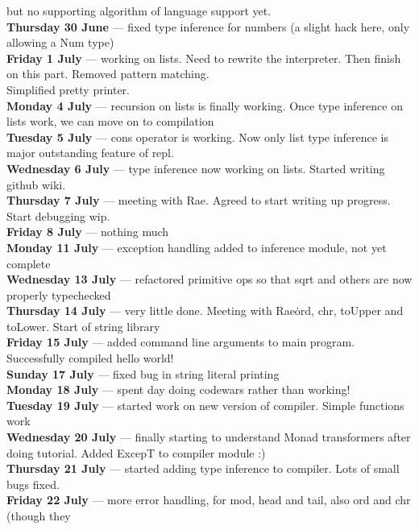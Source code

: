                     but no supporting algorithm of language support yet. \\
\textbf{Thursday 30 June}  --- fixed type inference for numbers (a slight hack here, only allowing a Num type) \\
\textbf{Friday 1 July}  --- working on lists. Need to rewrite the interpreter. Then finish on this part. Removed pattern matching.  \\
                    Simplified pretty printer. \\
\textbf{Monday 4 July}  --- recursion on lists is finally working. Once type inference on lists work, we can move on to compilation \\
\textbf{Tuesday 5 July}  --- cons operator is working. Now only list type inference is major outstanding feature of repl. \\
\textbf{Wednesday 6 July}  --- type inference now working on lists. Started writing github wiki. \\
\textbf{Thursday 7 July}  --- meeting with Rae. Agreed to start writing up progress. Start debugging wip. \\
\textbf{Friday 8 July}  --- nothing much \\
\textbf{Monday 11 July}  --- exception handling added to inference module, not yet complete \\
\textbf{Wednesday 13 July}  --- refactored primitive ops so that sqrt and others are now properly typechecked \\
\textbf{Thursday 14 July}  --- very little done. Meeting with Rae\. ord, chr, toUpper and toLower. Start of string library \\
\textbf{Friday 15 July}  --- added command line arguments to main program. Successfully compiled hello world! \\
\textbf{Sunday 17 July}  --- fixed bug in string literal printing \\
\textbf{Monday 18 July}  --- spent day doing codewars rather than working! \\
\textbf{Tuesday 19 July}  --- started work on new version of compiler. Simple functions work \\
\textbf{Wednesday 20 July}  --- finally starting to understand Monad transformers after doing tutorial. Added ExcepT to compiler module :) \\
\textbf{Thursday 21 July}  --- started adding type inference to compiler. Lots of small bugs fixed. \\
\textbf{Friday 22 July}  --- more error handling, for mod, head and tail, also ord and chr (though they \\
